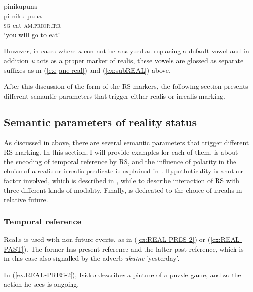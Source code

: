 \ea\label{ex:real-irr-no-clash}
\begingl 
\glpreamble pinikupuna\\
\gla pi-niku-puna\\ 
\textsc{sg}-eat-\textsc{am.prior}.\textsc{irr}\\ 
\glft ‘you will go to eat’\\ 
\endgl
\xe

However, in cases where \textit{a} can not be analysed as replacing a default vowel and in addition \textit{u} acts as a proper marker of realis, these vowels are glossed as separate suffixes as in (\ref{ex:jane-real}) and (\ref{ex:subREAL}) above.

After this discussion of the form of the RS markers, the following section presents different semantic parameters that trigger either realis or irrealis marking.

\subsection{Semantic parameters of reality status}\label{RS:parameters}

As discussed in  above, there are several semantic parameters that trigger different RS marking. In this section, I will provide examples for each of them.  is about the encoding of temporal reference by RS, and the influence of polarity in the choice of a realis or irrealis predicate is explained in . Hypotheticality is another factor involved, which is described in , while  to  describe interaction of RS with three different kinds of modality. Finally,  is dedicated to the choice of irrealis in relative future.

\subsubsection{Temporal reference}\label{sec:RS_TemporalReference}

Realis is used with non-future events, as in (\ref{ex:REAL-PRES-2}) or (\ref{ex:REAL-PAST}). The former has present reference and the latter past reference, which is in this case also signalled by the adverb \textit{ukuine} ‘yesterday’.

In (\ref{ex:REAL-PRES-2}), Isidro describes a picture of a puzzle game, and so the action he sees is ongoing.

